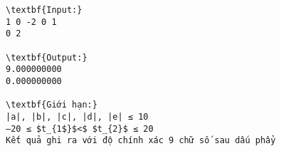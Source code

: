 \begin{verbatim}
\textbf{Input:}
1 0 -2 0 1
0 2

\textbf{Output:}
9.000000000
0.000000000

\textbf{Giới hạn:}
|a|, |b|, |c|, |d|, |e| ≤ 10
–20 ≤ $t_{1$}$<$ $t_{2}$ ≤ 20
Kết quả ghi ra với độ chính xác 9 chữ số sau dấu phẩy
\end{verbatim}